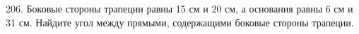 206. Боковые стороны трапеции равны 15 см и 20 см, а основания равны 6 см и 31 см. Найдите угол между прямыми, содержащими боковые стороны трапеции.\\
